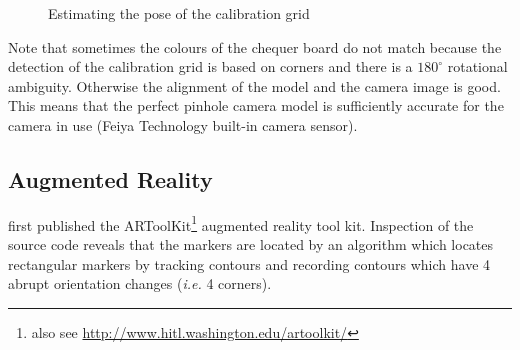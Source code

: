 \documentclass[12pt,a4paper,oneside,openright]{book}
\newcommand{\ie}{\emph{i.e.} }
\begin{document}
\begin{CJK}{UTF8}{}
\begin{figure}[htbp]
\begin{center}
\begin{minipage}[t]{.32\textwidth}
      \begin{center}
        \\
      \end{center}
    \end{minipage}\medskip\\
    \begin{minipage}[t]{.32\textwidth}
      \begin{center}
        \\
      \end{center}
    \end{minipage}
    \begin{minipage}[t]{.32\textwidth}
      \begin{center}
        \\
      \end{center}
    \end{minipage}
    \begin{minipage}[t]{.32\textwidth}
      \begin{center}
        \\
      \end{center}
    \end{minipage}
    \caption{Estimating the pose of the calibration grid\label{fig:calibpose}}
  \end{center}
\end{figure}
Note that sometimes the colours of the chequer board do not match because the detection of the calibration grid is based on corners and there is a $180^\circ$ rotational ambiguity. Otherwise the alignment of the model and the camera image is good. This means that the perfect pinhole camera model is sufficiently accurate for the camera in use (Feiya Technology built-in camera sensor).

\subsection{Augmented Reality}
\citet{kato1999marker} first published the ARToolKit\footnote{also see \url{http://www.hitl.washington.edu/artoolkit/}} augmented reality tool kit. Inspection of the source code reveals that the markers are located by an algorithm which locates rectangular markers by tracking contours and recording contours which have 4 abrupt orientation changes (\ie 4 corners).


\end{CJK}
\end{document}
